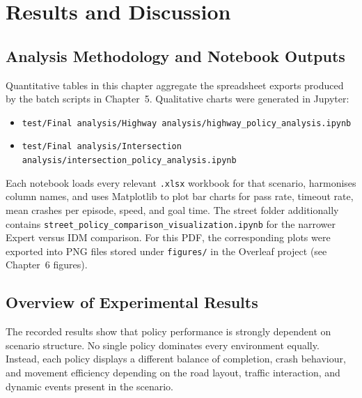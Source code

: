 \documentclass[12pt,a4paper]{report}
\begin{document}
\chapter{Results and Discussion}

\section{Analysis Methodology and Notebook Outputs}
Quantitative tables in this chapter aggregate the spreadsheet exports produced by the batch scripts in Chapter~5. Qualitative charts were generated in Jupyter:

\begin{itemize}
    \item \texttt{test/Final analysis/Highway analysis/highway\_policy\_analysis.ipynb}
    \item \texttt{test/Final analysis/Intersection analysis/intersection\_policy\_analysis.ipynb}
\end{itemize}

Each notebook loads every relevant \texttt{.xlsx} workbook for that scenario, harmonises column names, and uses Matplotlib to plot bar charts for pass rate, timeout rate, mean crashes per episode, speed, and goal time. The street folder additionally contains \texttt{street\_policy\_comparison\_visualization.ipynb} for the narrower Expert versus IDM comparison. For this PDF, the corresponding plots were exported into PNG files stored under \texttt{figures/} in the Overleaf project (see Chapter~6 figures).

\section{Overview of Experimental Results}
The recorded results show that policy performance is strongly dependent on scenario structure. No single policy dominates every environment equally. Instead, each policy displays a different balance of completion, crash behaviour, and movement efficiency depending on the road layout, traffic interaction, and dynamic events present in the scenario.
\end{document}
